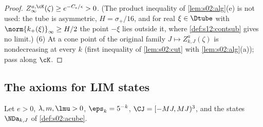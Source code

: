 \begin{proof}
$Z^{a,\cK}_\infty(\zeta)\ge e^{-C_\epsilon/\epsilon}>0$. (The product inequality of \cref{lem:s02:alg}(e) is not used: the tube is asymmetric, $H=\sigma_+/16$, and for real $\xi\in\Dtube$ with $\norm{k_+(\xi)}_\infty\ge H/2$ the point $-\xi$ lies outside it, where \cref{def:s12:contsub} gives no limit.) (6) At a cone point of the original family $J\mapsto Z^a_{k,J}(\zeta)$ is nondecreasing at every $k$ (first inequality of \cref{lem:s02:cut} with \cref{lem:s02:alg}(a)); pass along $\cK$.
\end{proof}

\subsection{The axioms for LIM states}

\begin{theorem}\label{thm:s12:LIM}
Let $e>0$, $\lambda,m,\lmu>0$, $\eps_k=5^{-k}$, $\CJ=[-MJ,MJ)^3$, and the states $\NDa_{k,J}$ of \cref{def:s02:acube}.


\end{theorem}

